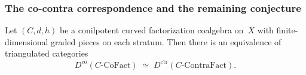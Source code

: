 \subsubsection*{The co-contra correspondence and the remaining conjecture}

\begin{theorem}
\label{thm:fact-co-contra-general}
Let $(C, d, h)$ be a conilpotent curved factorization coalgebra
on~$X$ with finite-dimensional graded pieces on each stratum.
Then there is an equivalence of triangulated categories
\begin{equation}\label{eq:fact-co-contra}
D^{\mathrm{co}}(C\text{-}\mathrm{CoFact})
\;\simeq\;
D^{\mathrm{ctr}}(C\text{-}\mathrm{ContraFact}).
\end{equation}
\end{theorem}


